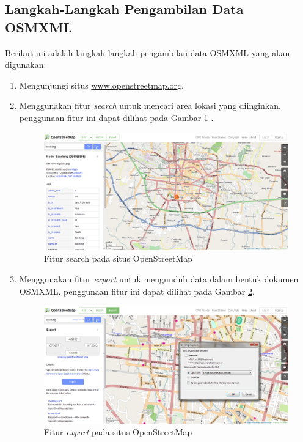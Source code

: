\subsection{Langkah-Langkah Pengambilan Data OSMXML}
Berikut ini adalah langkah-langkah pengambilan data OSMXML yang akan digunakan:
\begin{enumerate}
  \item Mengunjungi situs \url{www.openstreetmap.org}.
  
  \item Menggunakan fitur \textit{search} untuk mencari area lokasi yang
  diinginkan. penggunaan fitur ini dapat dilihat pada Gambar
  \ref{fig:osmsearch_analisis} .
\begin{figure}[h]
\centering
\includegraphics[scale=0.4]{Gambar/osmsearch_analisis}
\caption[Fitur search pada situs OpenStreetMap]{Fitur search pada situs
OpenStreetMap}
\label{fig:osmsearch_analisis}
\end{figure}
  
  \item Menggunakan fitur \textit{export} untuk mengunduh data dalam
  bentuk dokumen OSMXML. penggunaan fitur ini dapat dilihat pada Gambar
  \ref{fig:osmxml_analisis}.
\begin{figure}[h]
\centering
\includegraphics[scale=0.4]{Gambar/osmxml_analisis}
\caption[Fitur search pada situs OpenStreetMap]{Fitur \textit{export} pada situs
OpenStreetMap}
\label{fig:osmxml_analisis}
\end{figure}
\end{enumerate}

